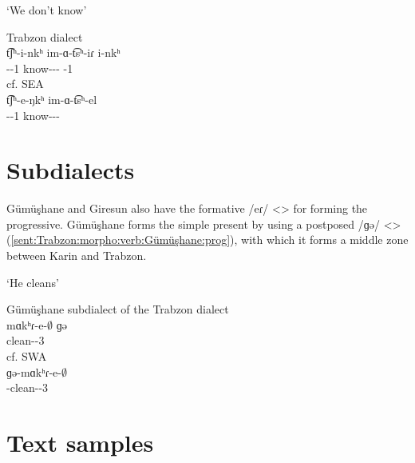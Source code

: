 \begin{exe}
	
	\ex `We don't know' \label{sent:Trabzon:morpho:verb:negRepetCop}
	\begin{xlist}
		\ex Trabzon dialect  \\
		\gll t͡ʃʰ-i-nkʰ im-ɑ-t͡sʰ-iɾ i-nkʰ\\
		{\neggloss}-{\aux}-1{\pl} know-{\lvgloss}-{\aor}-{\perfcvb} {\aux}-1{\pl} \\
		\trans {}
		\ex cf. SEA \\
		\gll t͡ʃʰ-e-ŋkʰ im-ɑ-t͡sʰ-el \\
		{\neggloss}-{\aux}-1{\pl} know-{\lvgloss}-{\aor}-{\perfcvb} \\
		\trans {}
	\end{xlist}
	
\end{exe}

\section{Subdialects}
Gümüşhane and Giresun also have the formative /eɾ/ <> for forming the progressive. Gümüşhane forms the simple present by using a postposed /ɡə/ <> (\ref{sent:Trabzon:morpho:verb:Gümüşhane:prog}), with which it forms a middle zone between Karin and Trabzon. 


\begin{exe}
	
	\ex `He cleans' \label{sent:Trabzon:morpho:verb:Gümüşhane:prog}
	\begin{xlist}
		\ex Gümüşhane subdialect of the Trabzon dialect  \\
		\gll mɑkʰɾ-e-$\emptyset$ ɡə\\
		clean-{\thgloss}-3{\sg} {\ind} \\
		\trans \armenian{մաքրէ գը}
		\ex cf. SWA 
		\\
		ɡə-mɑkʰɾ-e-$\emptyset$ \\
		{\ind}-clean-{\thgloss}-3{\sg}\\
		\armenian{կը մաքրէ}
	\end{xlist}
\end{exe}


\begin{adjarianpage}\label{page:180}\end{adjarianpage}%


\section{Text samples}

